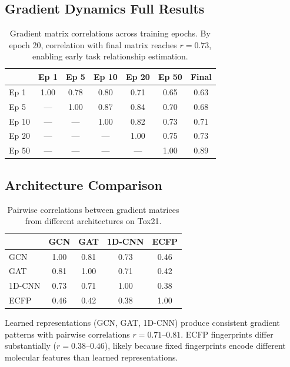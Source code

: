\documentclass{article}
\begin{document}
\subsection{Gradient Dynamics Full Results}
\begin{table}[!ht]
\caption{Gradient matrix correlations across training epochs. By epoch 20, correlation with final matrix reaches $r = 0.73$, enabling early task relationship estimation.}
\begin{center}
\begin{tabular*}{\textwidth}{@{\extracolsep{\fill}}lcccccc@{}}
\toprule
 & Ep 1 & Ep 5 & Ep 10 & Ep 20 & Ep 50 & Final \\
\midrule
Ep 1 & 1.00 & 0.78 & 0.80 & 0.71 & 0.65 & 0.63 \\
Ep 5 & --- & 1.00 & 0.87 & 0.84 & 0.70 & 0.68 \\
Ep 10 & --- & --- & 1.00 & 0.82 & 0.73 & 0.71 \\
Ep 20 & --- & --- & --- & 1.00 & 0.75 & 0.73 \\
Ep 50 & --- & --- & --- & --- & 1.00 & 0.89 \\
\bottomrule
\end{tabular*}
\end{center}
\end{table}
\subsection{Architecture Comparison}
\begin{table}[H]
\caption{Pairwise correlations between gradient matrices from different architectures on Tox21.}
\begin{center}
\begin{tabular}{lcccc}
\toprule
 & GCN & GAT & 1D-CNN & ECFP \\
\midrule
GCN & 1.00 & 0.81 & 0.73 & 0.46 \\
GAT & 0.81 & 1.00 & 0.71 & 0.42 \\
1D-CNN & 0.73 & 0.71 & 1.00 & 0.38 \\
ECFP & 0.46 & 0.42 & 0.38 & 1.00 \\
\bottomrule
\end{tabular}
\end{center}
\end{table}
Learned representations (GCN, GAT, 1D-CNN) produce consistent gradient patterns with pairwise correlations $r = 0.71$--$0.81$. ECFP fingerprints differ substantially ($r = 0.38$--$0.46$), likely because fixed fingerprints encode different molecular features than learned representations.
\end{document}
